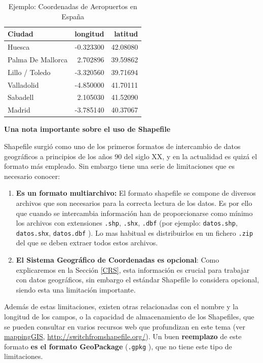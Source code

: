 \documentclass[
]{report}
\begin{document}
\begin{table}

\caption{\label{tab:unnamed-chunk-6}Ejemplo: Coordenadas de Aeropuertos en España}
\centering
\begin{tabular}[t]{l|r|r}
\hline
Ciudad & longitud & latitud\\
\hline
Huesca & -0.323300 & 42.08080\\
\hline
Palma De Mallorca & 2.702896 & 39.59862\\
\hline
Lillo / Toledo & -3.320560 & 39.71694\\
\hline
Valladolid & -4.850000 & 41.70111\\
\hline
Sabadell & 2.105030 & 41.52090\\
\hline
Madrid & -3.785140 & 40.37067\\
\hline
\end{tabular}
\end{table}

\textbf{Una nota importante sobre el uso de Shapefile}

Shapefile surgió como uno de los primeros formatos de intercambio de datos
geográficos a principios de los años 90 del siglo XX, y en la actualidad es
quizá el formato más empleado. Sin embargo tiene una serie de limitaciones que
es necesario conocer:

\begin{enumerate}
\def\labelenumi{\arabic{enumi}.}
\item
  \textbf{Es un formato multiarchivo:} El formato shapefile se compone de diversos
  archivos que son necesarios para la correcta lectura de los datos. Es por
  ello que cuando se intercambia información han de proporcionarse como mínimo
  los archivos con extensiones \texttt{.shp}, \texttt{.shx}, \texttt{.dbf} (por ejemplo:
  \texttt{datos.shp}, \texttt{datos.shx}, \texttt{datos.dbf} ). Lo mas habitual es distribuirlos en
  un fichero \texttt{.zip} del que se deben extraer todos estos archivos.
\item
  \textbf{El Sistema Geográfico de Coordenadas es opcional}: Como explicaremos en
  la Sección \ref{CRS}, esta información es crucial para trabajar con datos
  geográficos, sin embargo el estándar Shapefile lo considera opcional, siendo
  esta una limitación importante.
\end{enumerate}

Además de estas limitaciones, existen otras relacionadas con el nombre y la
longitud de los campos, o la capacidad de almacenamiento de los Shapefiles, que
se pueden consultar en varios recursos web que profundizan en este tema (ver
\href{https://mappinggis.com/2012/08/shapefiles-vs-bases-de-datos-espaciales/\#Desventajas_de_los_shapefiles}{mappingGIS},
\url{http://switchfromshapefile.org/}). Un buen \textbf{reemplazo} de este formato \textbf{es
el formato GeoPackage} (\texttt{.gpkg} ), que no tiene este tipo de limitaciones.
\end{document}
